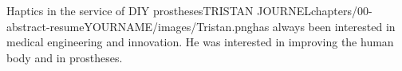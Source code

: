 

 
\begin{thesis}{Haptics in the service of DIY prostheses}{TRISTAN JOURNEL}{chapters/00-abstract-resume}{YOURNAME/images/Tristan.png}{has always been interested in medical engineering and innovation. He was interested in improving the human body and in prostheses.}   
    
    
    
    
     
    
\end{thesis}


